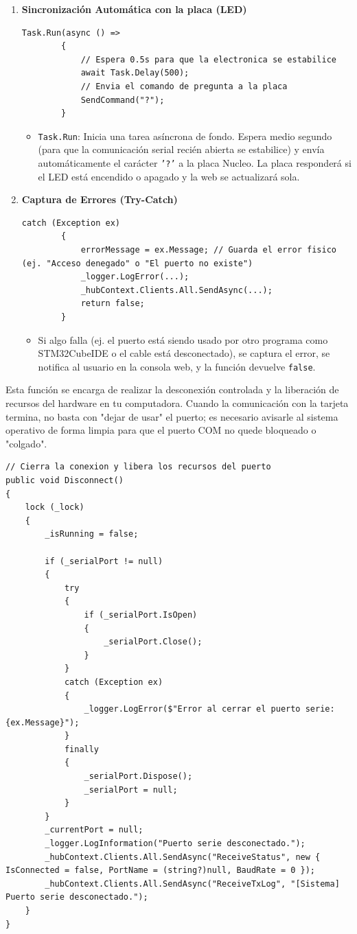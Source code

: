 \documentclass[
10pt, %
a4paper, %
oneside, %
headinclude,footinclude, %
BCOR5mm, %
]{scrartcl}
\begin{document}
\begin{enumerate}
	\begin{itemize}
		\item Envía notificaciones de manera instantánea a todos los navegadores conectados diciendo: \textit{"¡Ya estamos conectados!"} y añade un registro de log a la consola.
	\end{itemize}
	\item \textbf{Sincronización Automática con la placa (LED)}
		\begin{lstlisting}[style=VSCodeDark]
		Task.Run(async () =>
		{
			// Espera 0.5s para que la electronica se estabilice
			await Task.Delay(500);
			// Envia el comando de pregunta a la placa		 
			SendCommand("?");      
		}\end{lstlisting}
	\begin{itemize}
		\item \texttt{Task.Run}: Inicia una tarea asíncrona de fondo. Espera medio segundo (para que la comunicación serial recién abierta se estabilice) y envía automáticamente el carácter \texttt{'?'} a la placa Nucleo. La placa responderá si el LED está encendido o apagado y la web se actualizará sola.
	\end{itemize}
	\item \textbf{Captura de Errores (Try-Catch)}
	\begin{lstlisting}[style=VSCodeDark]
		catch (Exception ex)
		{
			errorMessage = ex.Message; // Guarda el error fisico (ej. "Acceso denegado" o "El puerto no existe")
			_logger.LogError(...);
			_hubContext.Clients.All.SendAsync(...);
			return false;
		}
	\end{lstlisting}
	\begin{itemize}
		\item Si algo falla (ej. el puerto está siendo usado por otro programa como STM32CubeIDE o el cable está desconectado), se captura el error, se notifica al usuario en la consola web, y la función devuelve \texttt{false}.
	\end{itemize}
\end{enumerate}

Esta función se encarga de realizar la desconexión controlada y la liberación de recursos del hardware en tu computadora. Cuando la comunicación con la tarjeta termina, no basta con "dejar de usar" el puerto; es necesario avisarle al sistema operativo de forma limpia para que el puerto COM no quede bloqueado o "colgado".
\begin{lstlisting}[style=VSCodeDark]
// Cierra la conexion y libera los recursos del puerto
public void Disconnect()
{
	lock (_lock)
	{
		_isRunning = false;
		
		if (_serialPort != null)
		{
			try
			{
				if (_serialPort.IsOpen)
				{
					_serialPort.Close();
				}
			}
			catch (Exception ex)
			{
				_logger.LogError($"Error al cerrar el puerto serie: {ex.Message}");
			}
			finally
			{
				_serialPort.Dispose();
				_serialPort = null;
			}
		}
		_currentPort = null;
		_logger.LogInformation("Puerto serie desconectado.");
		_hubContext.Clients.All.SendAsync("ReceiveStatus", new { IsConnected = false, PortName = (string?)null, BaudRate = 0 });
		_hubContext.Clients.All.SendAsync("ReceiveTxLog", "[Sistema] Puerto serie desconectado.");
	}
}
\end{lstlisting}
\end{document}
